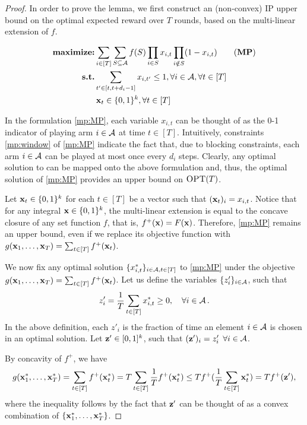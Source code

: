 \restateStructuralCP*
\begin{proof}
In order to prove the lemma, we first construct an (non-convex) IP upper bound on the optimal expected reward over $T$ rounds, based on the multi-linear extension of $f$.

\begin{align}
\textbf{maximize:}& \sum_{i \in [T]} \sum_{S \subseteq \A} f(S) \prod_{i \in S} x_{i,t} \prod_{i \notin S} (1-x_{i,t}) \tag{\textbf{MP}} \label{mp:MP}\\
\textbf{s.t.}& \sum_{t' \in [t,t+d_i-1]} x_{i,t'} \leq 1, \forall i \in \A, \forall t \in [T] \label{mp:window} \\
\qquad &\x_{t} \in \{0,1\}^k, \forall t \in [T] \notag
\end{align}

In the formulation \eqref{mp:MP}, each variable $x_{i,t}$ can be thought of as the 0-1 indicator of playing arm $i\in \operatorname{\mathcal{A}}$ at time $t \in [T]$. Intuitively, constraints \eqref{mp:window} of \eqref{mp:MP} indicate the fact that, due to blocking constraints, each arm $i \in \operatorname{\mathcal{A}}$ can be played at most once every $d_i$ steps. Clearly, any optimal solution to \rsm can be mapped onto the above formulation and, thus, the optimal solution of \eqref{mp:MP} provides an upper bound on $\textsc{OPT}(T)$.


Let $\operatorname{\mathbf{x}}_t \in \{0,1\}^k$ for each $t \in [T]$ be a vector such that $(\operatorname{\mathbf{x}}_t)_i = x_{i,t}$. Notice that for any integral $\operatorname{\mathbf{x}} \in \{0,1\}^k$, the multi-linear extension is equal to the concave closure of any set function $f$, that is, $f^+(\operatorname{\mathbf{x}}) = F(\operatorname{\mathbf{x}})$. Therefore, \eqref{mp:MP} remains an upper bound, even if we replace its objective function with $g(\operatorname{\mathbf{x}}_1, \dots, \operatorname{\mathbf{x}}_T) = \sum_{t \in [T]} f^+(\operatorname{\mathbf{x}}_t)$.

We now fix any optimal solution $\{x^*_{i,t}\}_{i\in \operatorname{\mathcal{A}}, t \in [T]}$ to \eqref{mp:MP} under the objective $g(\operatorname{\mathbf{x}}_1, \dots, \operatorname{\mathbf{x}}_T) = \sum_{t \in [T]} f^+(\operatorname{\mathbf{x}}_t)$. Let us define the variables $\{z'_{i}\}_{i \in \operatorname{\mathcal{A}}}$, such that
\begin{align*}
    z'_i = \frac{1}{T} \sum_{t \in [T]} x^*_{i,t} \geq 0, \quad \forall i \in \operatorname{\mathcal{A}}.
\end{align*}
In the above definition, each $z'_i$ is the fraction of time an element $i \in \operatorname{\mathcal{A}}$ is chosen in an optimal solution. Let $\operatorname{\mathbf{z}}' \in [0,1]^k$, such that $(\operatorname{\mathbf{z}}')_i = z'_i$ $\forall i \in \operatorname{\mathcal{A}}$.

By concavity of $f^+$, we have
\begin{align*}
g(\operatorname{\mathbf{x}}^*_1, \dots, \operatorname{\mathbf{x}}^*_T) = \sum_{t \in [T]} f^+(\operatorname{\mathbf{x}}^*_t) = T \sum_{t \in [T]} \frac{1}{T} f^+(\operatorname{\mathbf{x}}^*_t) \leq T f^+(\frac{1}{T}\sum_{t \in [T]}\operatorname{\mathbf{x}}^*_t) = T f^+(\operatorname{\mathbf{z}}'),
\end{align*}
where the inequality follows by the fact that $\operatorname{\mathbf{z}}'$ can be thought of as a convex combination of $\{\operatorname{\mathbf{x}}^*_1, \dots, \operatorname{\mathbf{x}}^*_T\}$.



\end{proof}
